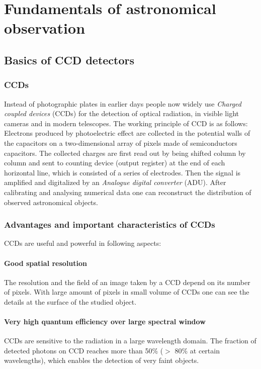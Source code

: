 \section{Fundamentals of astronomical observation} \label{intro}
\subsection{Basics of CCD detectors} \label{ccd}
\subsubsection{CCDs}
Instead of photographic plates in earlier days people now widely use \textit{Charged coupled devices} (CCDs) for the detection of optical radiation, in visible light cameras and in modern telescopes. The working principle of CCD is as follows: Electrons produced by photoelectric effect are collected in the potential walls of the capacitors on a two-dimensional array of pixels made of semiconductors capacitors. The collected charges are first read out by being shifted column by column and sent to counting device (output register) at the end of each horizontal line, which is consisted of a series of electrodes. Then the signal is amplified and digitalized by an \textit{Analogue digital converter} (ADU). After calibrating and analysing numerical data one can reconstruct the distribution of observed astronomical objects.
\subsubsection{Advantages and important characteristics of CCDs}
CCDs are useful and powerful in following aspects:

\paragraph{Good spatial resolution}
  The resolution and the field of an image taken by a CCD depend on its number of pixels. With large amount of pixels in small volume of CCDs one can see the details at the surface of the studied object.
  
\paragraph{Very high quantum efficiency over large spectral window}
  CCDs are sensitive to the radiation in a large wavelength domain. The fraction of detected photons on CCD reaches more than 50\% ($>$ 80\% at certain wavelengths), which enables the detection of very faint objects. 
  
